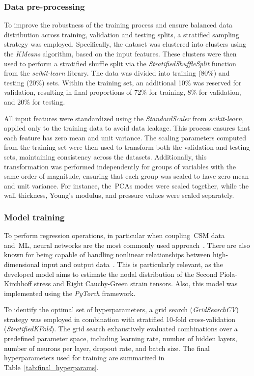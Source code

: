 \documentclass[a4paper,fleqn]{cas-sc}
\begin{document}
  \subsubsection{Data pre-processing}
    To improve the robustness of the training process and ensure balanced data distribution across training, validation and testing splits, a stratified sampling strategy was employed. Specifically, the dataset was clustered into clusters using the \textit{KMeans} algorithm, based on the input features. These clusters were then used to perform a stratified shuffle split via the \textit{StratifiedShuffleSplit} function from the \textit{scikit-learn} library. The data was divided into training (80\%) and testing (20\%) sets. Within the training set, an additional 10\% was reserved for validation, resulting in final proportions of 72\% for training, 8\% for validation, and 20\% for testing.

    All input features were standardized using the \textit{StandardScaler} from \textit{scikit-learn}, applied only to the training data to avoid data leakage. This process ensures that each feature has zero mean and unit variance. The scaling parameters computed from the training set were then used to transform both the validation and testing sets, maintaining consistency across the datasets. Additionally, this transformation was performed independently for groups of variables with the same order of magnitude, ensuring that each group was scaled to have zero mean and unit variance. For instance, the~\glspl{PCA} modes were scaled together, while the wall thickness, Young's modulus, and pressure values were scaled separately.

  \subsubsection{Model training}
    To perform regression operations, in particular when coupling~\gls{CSM} data and~\gls{ML}, neural networks are the most commonly used approach~\cite{phellan2021}. There are also known for being capable of handling nonlinear relationships between high-dimensional input and output data~\cite{Liang2018b}. This is particularly relevant, as the developed model aims to estimate the nodal distribution of the Second Piola-Kirchhoff stress and Right Cauchy-Green strain tensors. Also, this model was implemented using the \textit{PyTorch} framework.

    To identify the optimal set of hyperparameters, a grid search (\textit{GridSearchCV}) strategy was employed in combination with stratified 10-fold cross-validation (\textit{StratifiedKFold}). The grid search exhaustively evaluated combinations over a predefined parameter space, including learning rate, number of hidden layers, number of neurons per layer, dropout rate, and batch size. The final hyperparameters used for training are summarized in Table~\ref{tab:final_hyperparams}. 
      
\end{document}
